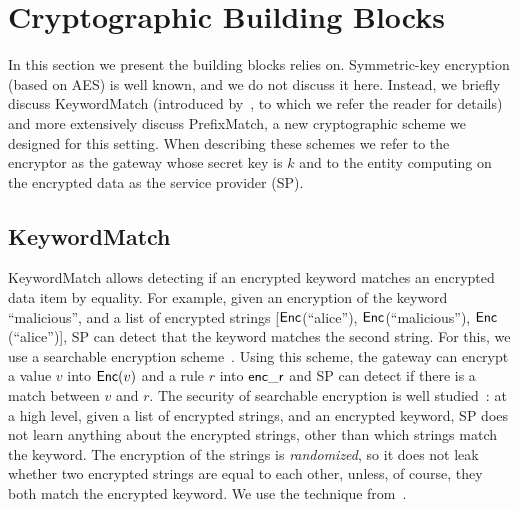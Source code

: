 


\section{Cryptographic Building Blocks}
\label{sec:buildingblocks}

In this section we present the building blocks \sys relies on.
Symmetric-key encryption (based on AES) is well known, and we do not discuss it here. Instead, we briefly discuss KeywordMatch (introduced by~\cite{blindbox}, to which we refer the reader for details) and more extensively discuss PrefixMatch, a new cryptographic scheme we designed for this setting.
When describing these schemes we refer to the encryptor as the gateway whose secret key is $k$ and to the entity computing on the encrypted data as the service provider (SP).


\subsection{KeywordMatch}\label{s:kwmatch}


KeywordMatch allows detecting if an encrypted keyword matches an encrypted data item by equality.
For example, given an encryption of the keyword ``malicious'', and a list of encrypted strings  [$\mathsf{Enc}$(``alice''), $\mathsf{Enc}$(``malicious''), $\mathsf{Enc}$(``alice'')], SP can  detect that the keyword matches the second string. 
For  this, we use a searchable encryption scheme~\cite{song:search, blindbox}.
Using this scheme, the gateway can encrypt a value $v$ into $\mathsf{Enc}(v)$ and a rule $r$ into $\mathsf{enc\_r}$ and SP can detect if there is a match between $v$ and $r$. 
 The security of searchable encryption is well studied~\cite{song:search, blindbox}: at a high level,  given a list of encrypted strings, and an encrypted keyword, SP does not learn anything about the encrypted strings, other than which strings match the keyword. 
 The encryption of the strings is {\em randomized}, so it does not leak whether two encrypted strings are equal to each other, unless, of course, they both match the encrypted keyword. 
  We use the technique from~\cite{blindbox}.


